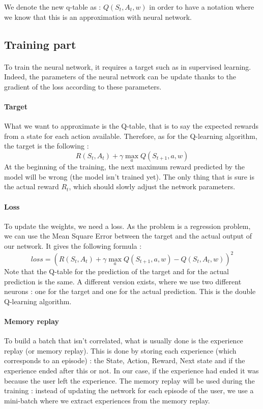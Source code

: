 \documentclass[a4paper]{article}
\begin{document}
We denote the new q-table as : $Q(S_t, A_t , w)$ in order to have a notation where we know that this is an approximation with neural network.


\subsection{Training part}

\paragraph{} To train the neural network, it requires a target such as in supervised learning. Indeed, the parameters of the neural network can be update thanks to the gradient of the loss according to these parameters. \\



\paragraph{Target} What we want to approximate is the Q-table, that is to say the expected rewards from a state for each action available. Therefore, as for the Q-learning algorithm, the target is the following : 
\[  R(S_t, A_t) + \gamma \max_{a} Q(S_{t+1}, a, w)              \]
At the beginning of the training, the next maximum reward predicted by the model will be wrong (the model isn't trained yet). The only thing that is sure is the actual reward $R_t$, which should slowly adjust the network parameters.

\paragraph{Loss} To update the weights, we need a loss. As the problem is a regression problem, we can use the Mean Square Error between the target and the actual output of our network. It gives the following formula : 
\[  loss = (R(S_t, A_t) + \gamma \max_{a} Q(S_{t+1}, a, w) - Q(S_t, A_t , w))^2                                  \]
Note that the Q-table for the prediction of the target and for the actual prediction is the same. A different version exists, where we use two different neurons : one for the target and one for the actual prediction. This is the double Q-learning algorithm. 

\paragraph{Memory replay} To build a batch that isn't correlated, what is usually done is the experience replay (or memory replay). This is done by storing each experience (which corresponds to an episode) : the State, Action, Reward, Next state and if the experience ended after this or not. In our case, if the experience had ended it was because the user left the experience. The memory replay will be used during the training : instead of updating the network for each episode of the user, we use a mini-batch where we extract experiences from the memory replay.
\end{document}
